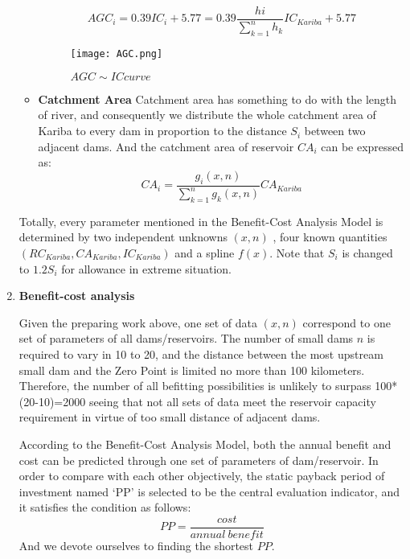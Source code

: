 \documentclass[12pt]{article}%
\begin{document}
\begin{enumerate}[1.]
\begin{itemize}
$$AGC_{i}=0.39IC_{i}+5.77=0.39 \frac{hi}{\sum_{k=1}^{n}h_{k}}IC_{Kariba}+5.77$$
\par
	\begin{figure}[H]
	\centering
	\texttt{[image: AGC.png]}
	\caption{$AGC\sim IC curve$}
	\label{AGC}
	\end{figure}
\item{\textbf{Catchment Area}}
Catchment area has something to do with the length of river, and consequently we distribute the whole catchment area of Kariba to every dam in proportion to the distance $S_{i}$ between two adjacent dams. And the catchment area   of reservoir $CA_{i}$ can be expressed as:
$$CA_{i} = \frac{g_{i}(x,n)}{\sum_{k=1}^{n} g_{k}(x,n)} CA_{Kariba}$$
	\end{itemize}
Totally, every parameter mentioned in the Benefit-Cost Analysis Model is determined by two independent unknowns $(x,n)$ , four known quantities $(RC_{Kariba},CA_{Kariba},IC_{Kariba})$ and a spline $f(x)$. Note that $S_{i}$ is changed to $1.2S_{i}$ for allowance in extreme situation.
	\item{\textbf{Benefit-cost analysis}}
\par
\noindent
	Given the preparing work above, one set of data $(x,n)$ correspond to one set of parameters of all dams/reservoirs. The number of small dams $n$ is required to vary in 10 to 20, and the distance between the most upstream small dam and the Zero Point   is limited no more than 100 kilometers. Therefore, the number of all befitting possibilities is unlikely to surpass 100*(20-10)=2000 seeing that not all sets of data meet the reservoir capacity requirement in virtue of too small distance of adjacent dams.
\par
\noindent
\par
\noindent
According to the Benefit-Cost Analysis Model, both the annual benefit and cost can be predicted through one set of parameters of dam/reservoir. In order to compare with each other objectively, the static payback period of investment named ‘PP’ is selected to be the central evaluation indicator, and it satisfies the condition as follows:
$$PP=\frac{cost}{annual\ benefit}$$
And we devote ourselves to finding the shortest $PP$.
\end{enumerate}
\end{document}
